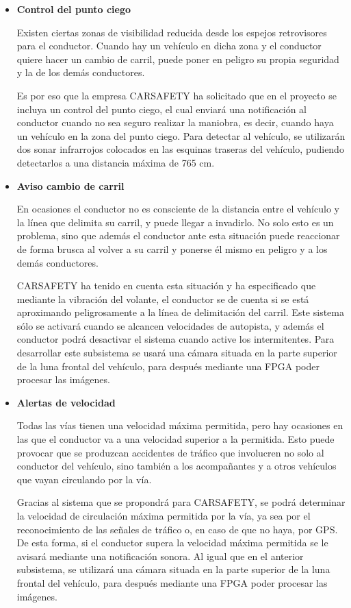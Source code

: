 \begin{itemize}[-]
\item \textbf{Control del punto ciego}
\par Existen ciertas zonas de visibilidad reducida desde los espejos retrovisores para el conductor. Cuando hay un vehículo en dicha zona y el conductor quiere hacer un cambio de carril, puede poner en peligro su propia seguridad y la de los demás conductores.
\par Es por eso que la empresa CARSAFETY ha solicitado que en el proyecto se incluya un control del punto ciego, el cual enviará una notificación al conductor cuando no sea seguro realizar la maniobra, es decir, cuando haya un vehículo en la zona del punto ciego. Para detectar al vehículo, se utilizarán dos sonar infrarrojos colocados en las esquinas traseras del vehículo, pudiendo detectarlos a una distancia máxima de 765 cm. 
\item \textbf{Aviso cambio de carril}
\par En ocasiones el conductor no es consciente de la distancia entre el vehículo y la línea que delimita su carril, y puede llegar a invadirlo. No solo esto es un problema, sino que además el conductor ante esta situación puede reaccionar de forma brusca al volver a su carril y ponerse él mismo en peligro y a los demás conductores.
\par CARSAFETY ha tenido en cuenta esta situación y ha especificado que mediante la vibración del volante, el conductor se de cuenta si se está aproximando peligrosamente a la línea de delimitación del carril. Este sistema sólo se activará cuando se alcancen velocidades de autopista, y además el conductor podrá desactivar el sistema cuando active los intermitentes. Para desarrollar este subsistema se usará una cámara situada en la parte superior de la luna frontal del vehículo, para después mediante una FPGA poder procesar las imágenes. 
\item \textbf{Alertas de velocidad}
\par Todas las vías tienen una velocidad máxima permitida, pero hay ocasiones en las que el conductor va a una velocidad superior a la permitida. Esto puede provocar que se produzcan accidentes de tráfico que involucren no solo al conductor del vehículo, sino también a los acompañantes y a otros vehículos que vayan circulando por la vía.
\par Gracias al sistema que se propondrá para CARSAFETY, se podrá determinar la velocidad de circulación máxima permitida por la vía, ya sea por el reconocimiento de las señales de tráfico o, en caso de que no haya, por GPS. De esta forma, si el conductor supera la velocidad máxima permitida se le avisará mediante una notificación sonora. Al igual que en el anterior subsistema, se utilizará una cámara situada en la parte superior de la luna frontal del vehículo, para después mediante una FPGA poder procesar las imágenes. 

\end{itemize}
